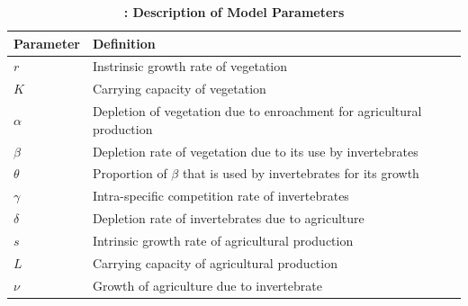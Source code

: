 \documentclass[12pt]{article}
\numberwithin{equation}{section}
\begin{document}
\begin{table}[htp!] \label{Table 1}
	\renewcommand{\arraystretch}{2}
	\caption{\textbf{: Description of Model Parameters}}
	\begin{center}
		\begin{tabular}{|p{2cm}||p{9cm}||p{5cm}|}
        \hline
			\textbf{Parameter} & \textbf{Definition} \\
			\hline
			$r$ & Instrinsic growth rate of vegetation\\
			\hline
			${K}$ & Carrying capacity of vegetation\\
			\hline
			${\alpha}$ & Depletion of vegetation due to enroachment for agricultural production\\
			\hline
			${\beta}$ & Depletion rate of vegetation due to its use by invertebrates\\
			\hline
			${\theta}$ & Proportion of $\beta$ that is used by invertebrates for its growth\\
		    \hline
			${\gamma}$ & Intra-specific competition rate of invertebrates\\
		    \hline
			${\delta}$ & Depletion rate of invertebrates due to agriculture\\
		    \hline
			${s}$ & Intrinsic growth rate of agricultural production\\
			\hline
			${L}$ & Carrying capacity of agricultural production\\
			\hline
			${\nu}$ & Growth of agriculture due to invertebrate\\
			\hline			
		\end{tabular}\label{Table 1}
	\end{center}
\end{table}
\end{document}
